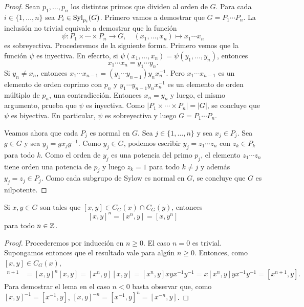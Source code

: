 \begin{proof}
	Sean $p_1,\dots,p_n$ los distintos primos que dividen al orden de $G$. Para cada
	$i\in\{1,\dots,n\}$ sea $P_i\in\mathrm{Syl}_{p_i}(G)$.  Primero vamos a demostrar
	que $G=P_1\cdots P_n$. La inclusión no trivial equivale a 
	demostrar que la función 
	\[
		\psi\colon P_1\times\cdots\times P_n\to G,\quad
		(x_1,\dots,x_n)\mapsto x_1\cdots x_n
	\]
	es sobreyectiva. Procederemos de la siguiente forma. Primero vemos que  
	la función $\psi$ es inyectiva. En efecrto, si
	$\psi(x_1,\dots,x_n)=\psi(y_1,\dots,y_n)$, entonces 
	\[
		x_1\cdots
	x_n=y_1\cdots y_n. 
	\]
	Si $y_n\ne x_n$, entonces $x_1\cdots x_{n-1}=(y_1\cdots
	y_{n-1})y_nx_n^{-1}$. Pero $x_1\cdots x_{n-1}$ es un elemento de orden
	coprimo con $p_n$ y $y_1\cdots y_{n-1}y_nx_n^{-1}$ es un elemento de orden
	múltiplo de $p_n$, una contradicción. Entonces $x_n=y_n$ y luego, el mismo
	argumento, prueba que $\psi$ es inyectiva. Como $|P_1\times\cdots\times
	P_n|=|G|$, se concluye que $\psi$ es biyectiva. En particular, $\psi$ es sobreyectiva
	y luego $G=P_1\cdots P_n$.

	Veamos ahora que cada $P_j$ es normal en $G$.  Sea $j\in\{1,\dots,n\}$ y
	sea $x_j\in P_j$. Sea $g\in G$ y sea $y_j=gx_jg^{-1}$.  Como $y_j\in G$,
	podemos escribir $y_j=z_1\cdots z_n$ con $z_k\in P_k$ para todo $k$.  Como
	el orden de $y_j$ es una potencia del primo $p_j$, el elemento $z_1\cdots
	z_n$ tiene orden una potencia de $p_j$ y luego $z_k=1$ para todo $k\ne j$ y
	además $y_j=z_j\in P_j$. Como cada subgrupo de Sylow es normal en $G$, se
	concluye que $G$ es nilpotente.
\end{proof}



\begin{lemma}
	\label{lemma:commutador}
	Si $x,y\in G$ son tales que $[x,y]\in C_G(x)\cap C_G(y)$, entonces
	\[
	[x,y]^n=[x^n,y]=[x,y^n]
	\]
	para todo $n\in\mathbb{Z}$.
\end{lemma}

\begin{proof}
	Procederemos por inducción en $n\geq0$. El caso $n=0$ es trivial. Supongamos entonces
	que el resultado vale para algún $n\geq0$. Entonces, como $[x,y]\in C_G(x)$, 
	\begin{align*}
		[x,y]^{n+1}&=[x,y]^n[x,y]
		=[x^n,y][x,y]=[x^n,y]xyx^{-1}y^{-1}=x[x^n,y]yx^{-1}y^{-1}=[x^{n+1},y].
	\end{align*}
	Para demostrar el lema en el caso $n<0$ basta observar que, como $[x,y]^{-1}=[x^{-1},y]$, 
	$[x,y]^{-n}=[x^{-1},y]^n=[x^{-n},y]$.
\end{proof}

